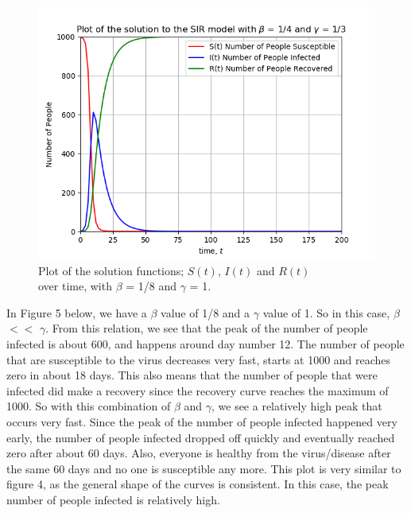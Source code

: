 \documentclass{article}
\begin{document}
\begin{figure}[!htb]
  \centering
  \includegraphics[width=1\linewidth]{Q2_plot3.png}
  \caption{Plot of the solution functions; $S(t)$, $I(t)$ and $R(t)$ \\ over time, with $\beta$ = 1/8 and $\gamma$ = 1.}
  \label{fig:Q2_plot3.png}
\end{figure}

In Figure 5 below, we have a $\beta$ value of 1/8 and a $\gamma$ value of 1. 
So in this case, $\beta$ $<<$ $\gamma$.
From this relation, we see that the peak of the number of people infected is about 600, and happens around day number 12.
The number of people that are susceptible to the virus decreases very fast, starts at 1000 and reaches zero in about 18 days.
This also means that the number of people that were infected did make a recovery since the recovery curve reaches the maximum of 1000.
So with this combination of $\beta$ and $\gamma$, we see a relatively high peak that occurs very fast.
Since the peak of the number of people infected happened very early, the number of people infected dropped off quickly and eventually reached zero after about 60 days.
Also, everyone is healthy from the virus/disease after the same 60 days and no one is susceptible any more.
This plot is very similar to figure 4, as the general shape of the curves is consistent.
In this case, the peak number of people infected is relatively high.
\newpage
\end{document}
